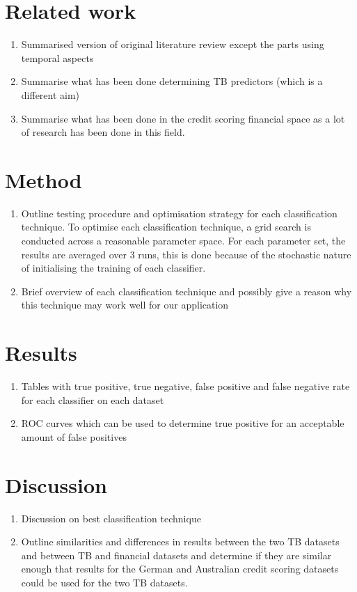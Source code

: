 \documentclass{sig-alternate-05-2015}
\begin{document}
\section{Related work}
\begin{enumerate}
	\item Summarised version of original literature review except the parts using temporal aspects
	\item Summarise what has been done determining TB predictors (which is a different aim)
	\item Summarise what has been done in the credit scoring financial space as a lot of research has been done in this field.
\end{enumerate}

\section{Method}
\begin{enumerate}
	\item Outline testing procedure and optimisation strategy for each classification technique. To optimise each classification technique, a grid search is conducted across a reasonable parameter space. For each parameter set, the results are averaged over 3 runs, this is done because of the stochastic nature of initialising the training of each classifier.
	\item Brief overview of each classification technique and possibly give a reason why this technique may work well for our application
\end{enumerate}

\section{Results}
\begin{enumerate}
	\item Tables with true positive, true negative, false positive and false negative rate for each classifier on each dataset
	\item ROC curves which can be used to determine true positive for an acceptable amount of false positives
\end{enumerate}

\section{Discussion}
\begin{enumerate}
	\item Discussion on best classification technique
	\item Outline similarities and differences in results between the two TB datasets and between TB and financial datasets and determine if they are similar enough that results for the German and Australian credit scoring datasets could be used for the two TB datasets.
	
\end{enumerate}
\end{document}
